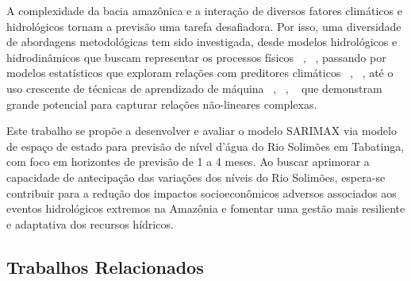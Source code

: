 \documentclass[ 12pt,a4paper ]{article} %
\begin{document}
		A complexidade da bacia amazônica e a interação de diversos fatores climáticos e hidrológicos tornam a previsão uma tarefa desafiadora. Por isso, uma diversidade de abordagens metodológicas tem sido investigada, desde modelos hidrológicos e hidrodinâmicos que buscam representar os processos físicos ~\cite{fan2021}, ~\cite{SIQUEIRA2020}, passando por modelos estatísticos que exploram relações com preditores climáticos ~\cite{Chevuturi2021}, ~\cite{Gubler2020}, até o uso crescente de técnicas de aprendizado de máquina ~\cite{Nguyen2015}, ~\cite{Duque2022}, ~\cite{LIU2023} que demonstram grande potencial para capturar relações não-lineares complexas.
		
		Este trabalho se propõe a desenvolver e avaliar o modelo SARIMAX via modelo de espaço de estado para previsão de nível d'água do Rio Solimões em Tabatinga, com foco em horizontes de previsão de 1 a 4 meses. Ao buscar aprimorar a capacidade de antecipação das variações dos níveis do Rio Solimões, espera-se contribuir para a redução dos impactos socioeconômicos adversos associados aos eventos hidrológicos extremos na Amazônia e fomentar uma gestão mais resiliente e adaptativa dos recursos hídricos.
		
		
		
		\subsection{Trabalhos Relacionados}%
		\label{ssect:cit-ref}%
		
\end{document}
